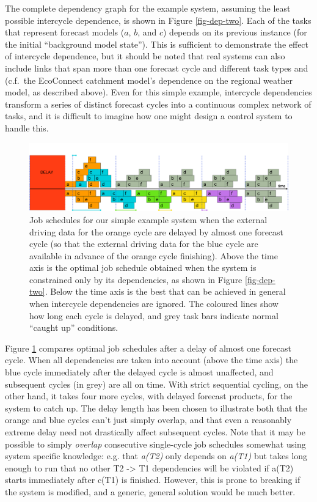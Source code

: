 \documentclass[11pt,a4paper]{article}
\begin{document}
The complete dependency graph for the example system, assuming the least
possible intercycle dependence, is shown in Figure \ref{fig-dep-two}.
Each of the tasks that represent forecast models ($a$, $b$, and $c$)
depends on its previous instance (for the initial ``background model
state''). This is sufficient to demonstrate the effect of intercycle
dependence, but it should be noted that real systems can also include
links that span more than one forecast cycle and different task
types and (c.f.\ the EcoConnect catchment model's dependence on the
regional weather model, as described above). Even for this simple
example, intercycle dependencies transform a series of distinct forecast
cycles into a continuous complex network of tasks, and it is difficult
to imagine how one might design a control system to handle this. 

\begin{figure} 
    \begin{center} 
        \includegraphics[width=12cm]{timeline-three}
    \end{center} 
    \caption{\small Job schedules for our simple example system when the
    external driving data for the orange cycle are delayed by almost one
    forecast cycle (so that the external driving data for the blue cycle
    are available in advance of the orange cycle finishing). Above the
    time axis is the optimal job schedule obtained when the system is
    constrained only by its dependencies, as shown in Figure
    \ref{fig-dep-two}. Below the time axis is the best that can be
    achieved in general when intercycle dependencies are ignored.
    The coloured lines show how long each cycle is delayed, and 
    grey task bars indicate normal ``caught up'' conditions.} 
    \label{fig-time-three}
\end{figure} 

Figure \ref{fig-time-three} compares optimal job schedules after a 
delay of almost one forecast cycle. When all dependencies are taken  
into account (above the time axis) the blue cycle immediately after the 
delayed cycle is almost unaffected, and subsequent cycles (in grey) 
are all on time. With strict sequential cycling, on the other hand,
it takes four more cycles, with delayed forecast products, for the
system to catch up. The delay length has been chosen to illustrate both
that the orange and blue cycles can't just simply overlap, and that 
even a reasonably extreme delay need not drastically affect subsequent
cycles.  Note that it may be possible to simply {\em overlap}
consecutive single-cycle job schedules somewhat using system specific
knowledge: e.g. that {\em a(T2)} only depends on {\em a(T1)} but takes
long enough to run that no other T2 -> T1 dependencies will be violated
if a(T2) starts immediately after c(T1) is finished. However, this is 
prone to breaking if the system is modified, and a generic, general
solution would be much better.
\end{document}
